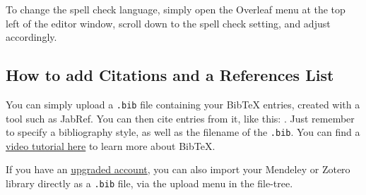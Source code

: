 \documentclass{article}
\begin{document}
To change the spell check language, simply open the Overleaf menu at the top left of the editor window, scroll down to the spell check setting, and adjust accordingly.

\subsection{How to add Citations and a References List}

You can simply upload a \verb|.bib| file containing your BibTeX entries, created with a tool such as JabRef. You can then cite entries from it, like this: \cite{greenwade93}. Just remember to specify a bibliography style, as well as the filename of the \verb|.bib|. You can find a \href{https://www.overleaf.com/help/97-how-to-include-a-bibliography-using-bibtex}{video tutorial here} to learn more about BibTeX.

If you have an \href{https://www.overleaf.com/user/subscription/plans}{upgraded account}, you can also import your Mendeley or Zotero library directly as a \verb|.bib| file, via the upload menu in the file-tree.











\end{document}
